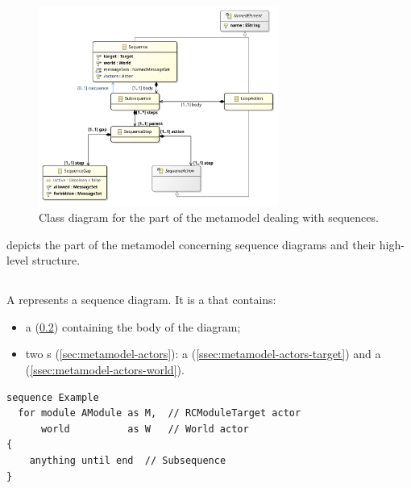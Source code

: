 \begin{figure}
	\centering
	\includegraphics[width=0.7\textwidth]{diagrams/Sequences}
	\caption{Class diagram for the part of the \langname{} metamodel dealing with sequences.}
	\label{fig:metamodel-sequences}
\end{figure}

 depicts the part of the metamodel concerning
sequence diagrams and their high-level structure.

\subsection{\msequence}

A \msequence{} represents a sequence diagram.  It is a \mnamedelement{}
that contains:

\begin{itemize}
\item
	a \msubsequence{} (\cref{ssec:metamodel-sequences-subsequences})
	containing the body of the diagram;
\item
	two \mactor s (\cref{sec:metamodel-actors}):
	a \mtarget{} (\cref{ssec:metamodel-actors-target})
	and a \mworld{} (\cref{ssec:metamodel-actors-world}).
\end{itemize}

\begin{lstlisting}[style=Example]
sequence Example
  for module AModule as M,  // RCModuleTarget actor
      world          as W   // World actor
{
    anything until end  // Subsequence
}
\end{lstlisting}

\subsection{\msubsequence}\label{ssec:metamodel-sequences-subsequences}

